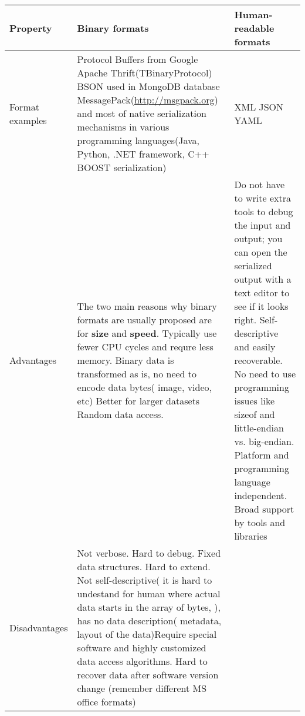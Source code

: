 \begin{table}[H]
	\centering	
	\begin{tabularx}{\textwidth}{|X|X|X|}
		\hline
		\textbf{Property} & 
		\textbf{Binary formats}  	& 
		\textbf{Human-readable formats}	
	    
	    \tabularnewline
		\hline
		Format examples &
		Protocol Buffers from Google \newline 
		{Apache Thrift(TBinaryProtocol)} \newline
		BSON used in MongoDB database \newline
		MessagePack(\url{http://msgpack.org})\newline
		and most of native serialization
		mechanisms in various programming languages(Java, Python, .NET framework,
		C++ BOOST serialization) &
		\gls{XML} \newline \gls{JSON} \newline \gls{YAML}
	
	    \tabularnewline
		\hline	  
		
		Advantages & 
		The two main reasons why binary formats are usually proposed
		are for \textbf{size} and \textbf{speed}. \newline
		Typically use fewer CPU cycles and requre less memory.
		Binary data is transformed as is, no need to encode data bytes( image, video,
		etc)
		Better for larger datasets \newline
		Random data access.
		

		
		&
		
		Do not have to write extra tools to debug the input and output; you can open
		the serialized output with a text editor to see if it looks right. \newline
		Self-descriptive and easily recoverable. \newline
		No need to use programming issues like sizeof and little-endian vs.
		big-endian. \newline
		Platform and programming language independent. \newline
		Broad support by tools and libraries \newline
		
		
		
		
		\tabularnewline
		\hline
		Disadvantages &
		Not verbose. Hard to debug. \newline
		Fixed data structures. Hard to extend. \newline
		Not self-descriptive( it is hard to undestand for human where actual data
		starts in the array of bytes, ), has no data description( metadata, layout
		of the data)\newline Require special software and  highly customized data
		access algorithms.
		Hard to recover data after software version change (remember different MS
		office formats)
				

\end{tabularx}
\end{table}
